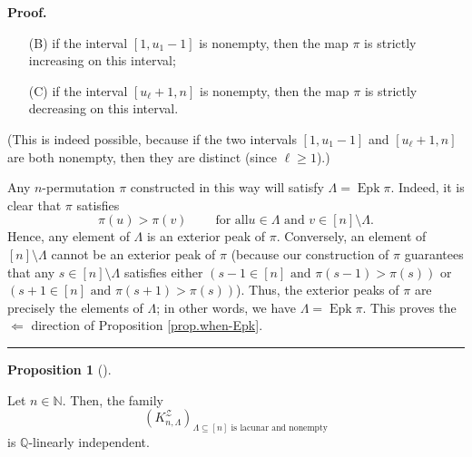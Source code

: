 \documentclass[numbers=enddot,12pt,final,onecolumn,notitlepage]{scrartcl}%
\theoremstyle{definition}
\newtheorem{prop}[theo]{Proposition}
\newenvironment{proposition}[1][]
{\begin{prop}[#1]\begin{leftbar}}
{\end{leftbar}\end{prop}}
\newenvironment{proof}[1][Proof]{\noindent\textbf{#1.} }{\ \rule{0.5em}{0.5em}}
\begin{document}
\begin{proof}
\begin{itemize}
\begin{itemize}
\item[(B)] if the interval $\left[  1,u_{1}-1\right]  $ is nonempty, then the
map $\pi$ is strictly increasing on this interval;

\item[(C)] if the interval $\left[  u_{\ell}+1,n\right]  $ is nonempty, then
the map $\pi$ is strictly decreasing on this interval.
\end{itemize}

(This is indeed possible, because if the two intervals $\left[  1,u_{1}%
-1\right]  $ and $\left[  u_{\ell}+1,n\right]  $ are both nonempty, then they
are distinct (since $\ell\geq1$).)
\end{itemize}

Any $n$-permutation $\pi$ constructed in this way will satisfy $\Lambda
=\operatorname*{Epk}\pi$. Indeed, it is clear that $\pi$ satisfies%
\[
\pi\left(  u\right)  >\pi\left(  v\right)  \ \ \ \ \ \ \ \ \ \ \text{for all
}u\in\Lambda\text{ and }v\in\left[  n\right]  \setminus\Lambda.
\]
Hence, any element of $\Lambda$ is an exterior peak of $\pi$. Conversely, an
element of $\left[  n\right]  \setminus\Lambda$ cannot be an exterior peak of
$\pi$ (because our construction of $\pi$ guarantees that any $s\in\left[
n\right]  \setminus\Lambda$ satisfies either $\left(  s-1\in\left[  n\right]
\text{ and }\pi\left(  s-1\right)  >\pi\left(  s\right)  \right)  $ or
$\left(  s+1\in\left[  n\right]  \text{ and }\pi\left(  s+1\right)
>\pi\left(  s\right)  \right)  $). Thus, the exterior peaks of $\pi$ are
precisely the elements of $\Lambda$; in other words, we have $\Lambda
=\operatorname*{Epk}\pi$. This proves the $\Longleftarrow$ direction of
Proposition \ref{prop.when-Epk}.
\end{proof}

\begin{proposition}
\label{prop.KnL.lindep}Let $n\in\mathbb{N}$. Then, the family%
\[
\left(  K_{n,\Lambda}^{\mathcal{Z}}\right)  _{\Lambda\subseteq\left[
n\right]  \text{ is lacunar and nonempty}}%
\]
is $\mathbb{Q}$-linearly independent.
\end{proposition}
\end{document}
